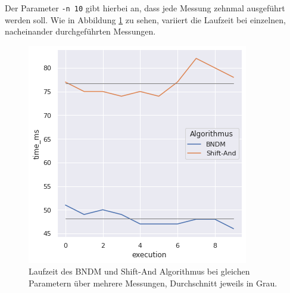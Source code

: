 \documentclass[twocolumn]{article}
\begin{document}
Der Parameter \texttt{-n 10} gibt hierbei an, dass jede Messung zehnmal ausgeführt werden soll. Wie in Abbildung \ref{fig:runtime_bndm_shift_and} zu sehen, variiert die Laufzeit bei einzelnen, nacheinander durchgeführten Messungen.

\begin{figure}
    \includegraphics[width=\linewidth]{assets/graph_3.png}
    \caption{Laufzeit des BNDM und Shift-And Algorithmus bei gleichen Parametern über mehrere Messungen, Durchschnitt jeweils in Grau.}
    \label{fig:runtime_bndm_shift_and}
\end{figure}
\end{document}
